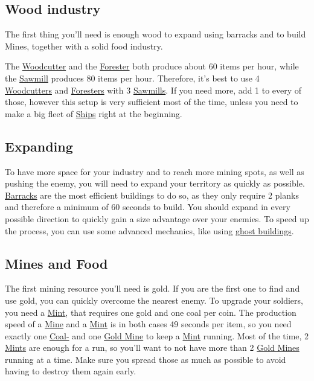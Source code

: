 \documentclass[12pt]{article}
\begin{document}
\subsection{Wood industry}
\label{sec:woodindustry}

The first thing you'll need is enough wood to expand using barracks and to build Mines, together with a solid food industry.

The \hyperref[sec:woodcutter]{Woodcutter} and the \hyperref[sec:forester]{Forester} both produce about 60 items per hour, while the \hyperref[sec:sawmill]{Sawmill} produces 80 items per hour. Therefore, it's best to use 4 \hyperref[sec:woodcutter]{Woodcutters} and \hyperref[sec:forester]{Foresters} with 3 \hyperref[sec:sawmill]{Sawmills}. If you need more, add 1 to every of those, however this setup is very sufficient most of the time, unless you need to make a big fleet of \hyperref[sec:ships]{Ships} right at the beginning.

\subsection{Expanding}
\label{sec:expanding}

To have more space for your industry and to reach more mining spots, as well as pushing the enemy, you will need to expand your territory as quickly as possible. \hyperref[sec:barrack]{Barracks} are the most efficient buildings to do so, as they only require 2 planks and therefore a minimum of 60 seconds to build. You should expand in every possible direction to quickly gain a size advantage over your enemies. To speed up the process, you can use some advanced mechanics, like using \hyperref[sec:ghostbuildings]{ghost buildings}.

\subsection{Mines and Food}
\label{sec:minesandfoot}

The first mining resource you'll need is gold. If you are the first one to find and use gold, you can quickly overcome the nearest enemy. To upgrade your soldiers, you need a \hyperref[sec:mint]{Mint}, that requires one gold and one coal per coin. The production speed of a \hyperref[sec:mine]{Mine} and a \hyperref[sec:mint]{Mint} is in both cases 49 seconds per item, so you need exactly one \hyperref[sec:coalmine]{Coal-} and one \hyperref[sec:goldmine]{Gold Mine} to keep a \hyperref[sec:mint]{Mint} running. Most of the time, 2 \hyperref[sec:mint]{Mints} are enough for a run, so you'll want to not have more than 2 \hyperref[sec:goldmine]{Gold Mines} running at a time. Make sure you spread those as much as possible to avoid having to destroy them again early.
\end{document}
